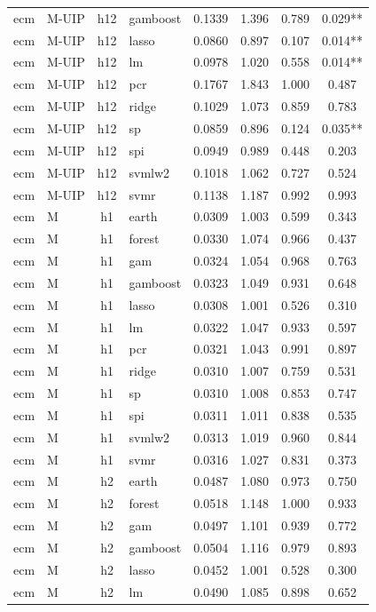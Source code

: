 \begin{ThreePartTable}
\begin{longtable}[t]{llclcccc}
ecm & M-UIP & h12 & gamboost & 0.1339 & 1.396 & 0.789 & 0.029**\\
ecm & M-UIP & h12 & lasso & 0.0860 & 0.897 & 0.107 & 0.014**\\
ecm & M-UIP & h12 & lm & 0.0978 & 1.020 & 0.558 & 0.014**\\
ecm & M-UIP & h12 & pcr & 0.1767 & 1.843 & 1.000 & 0.487\\
ecm & M-UIP & h12 & ridge & 0.1029 & 1.073 & 0.859 & 0.783\\
ecm & M-UIP & h12 & sp & 0.0859 & 0.896 & 0.124 & 0.035**\\
ecm & M-UIP & h12 & spi & 0.0949 & 0.989 & 0.448 & 0.203\\
ecm & M-UIP & h12 & svmlw2 & 0.1018 & 1.062 & 0.727 & 0.524\\
ecm & M-UIP & h12 & svmr & 0.1138 & 1.187 & 0.992 & 0.993\\
\addlinespace
ecm & M & h1 & earth & 0.0309 & 1.003 & 0.599 & 0.343\\
ecm & M & h1 & forest & 0.0330 & 1.074 & 0.966 & 0.437\\
ecm & M & h1 & gam & 0.0324 & 1.054 & 0.968 & 0.763\\
ecm & M & h1 & gamboost & 0.0323 & 1.049 & 0.931 & 0.648\\
ecm & M & h1 & lasso & 0.0308 & 1.001 & 0.526 & 0.310\\
ecm & M & h1 & lm & 0.0322 & 1.047 & 0.933 & 0.597\\
ecm & M & h1 & pcr & 0.0321 & 1.043 & 0.991 & 0.897\\
ecm & M & h1 & ridge & 0.0310 & 1.007 & 0.759 & 0.531\\
ecm & M & h1 & sp & 0.0310 & 1.008 & 0.853 & 0.747\\
ecm & M & h1 & spi & 0.0311 & 1.011 & 0.838 & 0.535\\
ecm & M & h1 & svmlw2 & 0.0313 & 1.019 & 0.960 & 0.844\\
ecm & M & h1 & svmr & 0.0316 & 1.027 & 0.831 & 0.373\\
\addlinespace
ecm & M & h2 & earth & 0.0487 & 1.080 & 0.973 & 0.750\\
ecm & M & h2 & forest & 0.0518 & 1.148 & 1.000 & 0.933\\
ecm & M & h2 & gam & 0.0497 & 1.101 & 0.939 & 0.772\\
ecm & M & h2 & gamboost & 0.0504 & 1.116 & 0.979 & 0.893\\
ecm & M & h2 & lasso & 0.0452 & 1.001 & 0.528 & 0.300\\
ecm & M & h2 & lm & 0.0490 & 1.085 & 0.898 & 0.652\\

\end{longtable}
\end{ThreePartTable}
